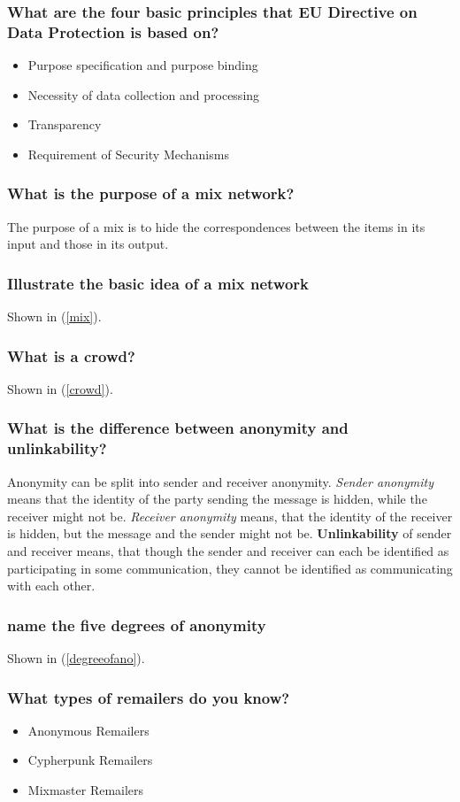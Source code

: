 \documentclass[a4paper, 10 pt, conference]{ieeeconf}
\begin{document}
\subsubsection{\textbf{What are the four basic principles that EU Directive on Data Protection is based on?}}
\begin{itemize}
\item Purpose specification and purpose binding
\item Necessity of data collection and processing
\item Transparency
\item Requirement of Security Mechanisms 
\end{itemize}

\subsubsection{\textbf{What is the purpose of a mix network?}}
The purpose of a mix is to hide the correspondences between the items in its input and those in its output.
\subsubsection{\textbf{Illustrate the basic idea of a mix network}}
Shown in (\ref{mix}).
\subsubsection{\textbf{What is a crowd?}}
Shown in (\ref{crowd}).
\subsubsection{\textbf{What is the difference between anonymity and unlinkability?}}
Anonymity can be split into sender and receiver anonymity. \emph{Sender anonymity} means that the identity of the party sending the message is hidden, while the receiver might not be. \emph{Receiver anonymity} means, that the identity of the receiver is hidden, but the message and the sender might not be. 
\textbf{Unlinkability} of sender and receiver means, that though the sender and receiver can each be identified as participating in some communication, they cannot be identified as communicating with each other. 
\subsubsection{\textbf{name the five degrees of anonymity}}
Shown in (\ref{degreeofano}).
\subsubsection{\textbf{What types of remailers do you know?}}
\begin{itemize}
\item Anonymous Remailers
\item Cypherpunk Remailers
\item Mixmaster Remailers
\end{itemize}
\end{document}
